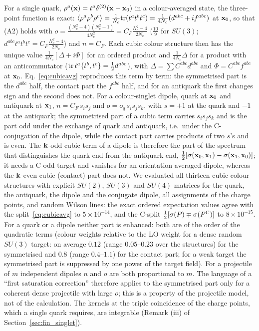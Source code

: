 For a single quark, $\rho^a(\mathbf{x})=t^a\delta^{(2)}(\mathbf{x}-\mathbf{x}_0)$ in a colour-averaged state, the three-point function is exact: $\langle\rho^a\rho^b\rho^c\rangle=\frac1{N_c}{\rm tr}(t^at^bt^c)=\frac{1}{4N_c}(d^{abc}+if^{abc})$ at $\mathbf{x}_0$, so that (A2) holds with $o=\frac{(N_c^2-4)(N_c^2-1)}{4N_c^2}=C_F\frac{N_c^2-4}{2N_c}$ ($\frac{10}{9}$ for $SU(3)$; $d^{abc}t^at^bt^c=C_F\frac{N_c^2-4}{2N_c}$) and $n=C_F$. Each cubic colour structure then has the unique value $\frac{1}{4N_c}[\Delta+i\Phi]$ for an ordered product and $\frac{1}{4N_c}\Delta$ for a product with an anticommutator (${\rm tr}\,t^a\{t^b,t^c\}=\frac12d^{abc}$), with $\Delta=\sum C^{abc}d^{abc}$ and $\Phi=C^{abc}f^{abc}$ at $\mathbf{x}_0$. Eq.~\eqref{eq:cubicavg} reproduces this term by term: the symmetrised part is the $d^{abc}$ half, the contact part the $f^{abc}$ half, and for an antiquark the first changes sign and the second does not. For a colour-singlet dipole, quark at $\mathbf{x}_0$ and antiquark at $\mathbf{x}_1$, $n=C_F\,s_is_j$ and $o=o_q\,s_is_js_k$, with $s=+1$ at the quark and $-1$ at the antiquark; the symmetrised part of a cubic term carries $s_is_js_k$ and is the part odd under the exchange of quark and antiquark, i.e.\ under the C-conjugation of the dipole, while the contact part carries products of two $s$'s and is even. The $\mathbf{k}$-odd cubic term of a dipole is therefore the part of the spectrum that distinguishes the quark end from the antiquark end, $\frac12[\sigma(\mathbf{x}_0,\mathbf{x}_1)-\sigma(\mathbf{x}_1,\mathbf{x}_0)]$; it needs a C-odd target and vanishes for an orientation-averaged dipole, whereas the $\mathbf{k}$-even cubic (contact) part does not. We evaluated all thirteen cubic colour structures with explicit $SU(2)$, $SU(3)$ and $SU(4)$ matrices for the quark, the antiquark, the dipole and the conjugate dipole, all assignments of the charge points, and random Wilson lines: the exact ordered expectation values agree with the split~\eqref{eq:cubicavg} to $5\times10^{-14}$, and the C-split $\frac12[\sigma(P)\mp\sigma(P^{\rm C})]$ to $8\times10^{-15}$. For a quark or a dipole neither part is enhanced: both are of the order of the quadratic terms (colour weights relative to the LO weight for a dense random $SU(3)$ target: on average $0.12$ (range $0.05$--$0.23$ over the structures) for the symmetrised and $0.8$ (range $0.4$--$1.1$) for the contact part; for a weak target the symmetrised part is suppressed by one power of the target field). For a projectile of $m$ independent dipoles $n$ and $o$ are both proportional to $m$. The language of a ``first saturation correction'' therefore applies to the symmetrised part only for a coherent dense projectile with large $o$; this is a property of the projectile model, not of the calculation. The kernels at the triple coincidence of the charge points, which a single quark requires, are integrable (Remark (iii) of Section~\ref{sec:fin_singlet}).

